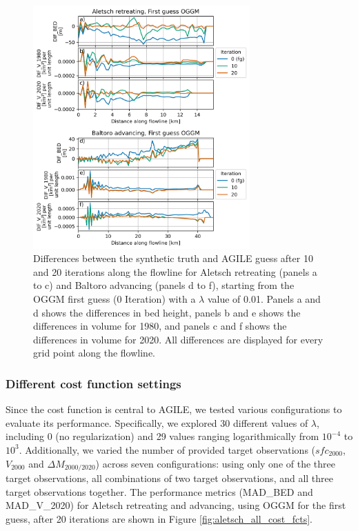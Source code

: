 \documentclass[journal abbreviation, manuscript]{copernicus}
\begin{document}
\begin{figure}
    \centering
    \includegraphics[width=8.3cm]{fig05.png}
    \caption{Differences between the synthetic truth and AGILE guess after 10 and 20 iterations along the flowline for Aletsch retreating (panels a to c) and Baltoro advancing (panels d to f), starting from the OGGM first guess (0 Iteration) with a $\lambda$ value of 0.01. Panels a and d shows the differences in bed height, panels b and e shows the differences in volume for 1980, and panels c and f shows the differences in volume for 2020. All differences are displayed for every grid point along the flowline.}
    \label{fig:aletsch_retreating_fg_oggm_baltoro_advancing_fg_oggm_along_fl}
\end{figure}

\subsubsection{Different cost function settings}
\label{subsec:different_cost_altesch_retreating}

Since the cost function is central to AGILE, we tested various configurations to evaluate its performance. Specifically, we explored 30 different values of $\lambda$, including 0 (no regularization) and 29 values ranging logarithmically from $10^{-4}$ to $10^{3}$. Additionally, we varied the number of provided target observations ($sfc_{2000}$, $V_{2000}$ and $\Delta M_{2000/2020}$) across seven configurations: using only one of the three target observations, all combinations of two target observations, and all three target observations together. The performance metrics (MAD\_BED and MAD\_V\_2020) for Aletsch retreating and advancing, using OGGM for the first guess, after 20 iterations are shown in Figure \ref{fig:aletsch_all_cost_fcts}.
\end{document}
